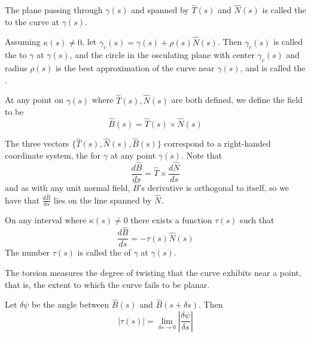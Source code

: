 \begin{appendices}
    The plane passing through $\gamma(s)$ and spanned by $\hat{T}(s)$ and $\hat{N}(s)$ is called the  to the curve at $\gamma(s)$.

    Assuming $\kappa(s) \neq 0$, let $\gamma_c(s) = \gamma(s)+\rho(s)\hat{N}(s)$. Then $\gamma_c(s)$ is called the  to $\gamma$ at $\gamma(s)$, and the circle in the osculating plane with center $\gamma_c(s)$ and radius $\rho(s)$ is the best approximation of the curve near $\gamma(s)$, and is called the .


    \begin{defn}
        At any point on $\gamma(s)$ where $\hat{T}(s),\hat{N}(s)$ are both defined, we define the  field to be \begin{equation*}
            \hat{B}(s) = \hat{T}(s)\times \hat{N}(s)
        \end{equation*}
    \end{defn}

    The three vectors $\{\hat{T}(s),\hat{N}(s),\hat{B}(s)\}$ correspond to a right-handed coordinate system, the  for $\gamma$ at any point $\gamma(s)$. Note that \begin{equation*}
        \frac{d\hat{B}}{ds} = \hat{T}\times \frac{d\hat{N}}{ds}
    \end{equation*}
    and as with any unit normal field, $\hat{B}$'s derivative is orthogonal to itself, so we have that $\frac{d\hat{B}}{ds}$ lies on the line spanned by $\hat{N}$. 

    \begin{defn}
        On any interval where $\kappa(s) \neq 0$ there exists a function $\tau(s)$ such that \begin{equation*}
            \frac{d\hat{B}}{ds} = -\tau(s)\hat{N}(s)
        \end{equation*}
        The number $\tau(s)$ is called the  of $\gamma$ at $\gamma(s)$.
    \end{defn}

    The torsion measures the degree of twisting that the curve exhibits near a point, that is, the extent to which the curve fails to be planar.

    Let $\delta \psi$ be the angle between $\hat{B}(s)$ and $\hat{B}(s+\delta s)$. Then \begin{equation*}
        |\tau(s)| = \lim\limits_{\delta s\rightarrow 0} \left|\frac{\delta \psi}{\delta s}\right|
    \end{equation*}


\end{appendices}
